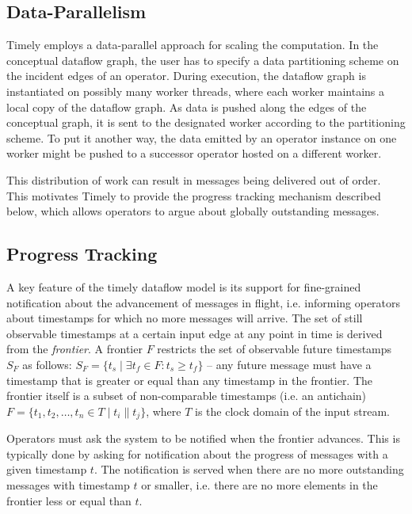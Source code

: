 \clearpage
\subsection{Data-Parallelism}

Timely employs a data-parallel approach for scaling the computation. In the
conceptual dataflow graph, the user has to specify a data partitioning scheme
on the incident edges of an operator. During execution, the dataflow graph
is instantiated on possibly many worker threads, where each worker maintains
a local copy of the dataflow graph. As data is pushed along the edges of the
conceptual graph, it is sent to the designated worker according to the
partitioning scheme. To put it another way, the data emitted by an operator
instance on one worker might be pushed to a successor operator
hosted on a different worker.

This distribution of work can result in messages being delivered out of
order. This motivates Timely to provide the progress tracking mechanism
described below, which allows operators to argue about globally
outstanding messages.

\subsection{Progress Tracking}

A key feature of the timely dataflow model is its support for fine-grained notification
about the advancement of messages in flight, i.e. informing operators about
timestamps for which no more messages will arrive. The set of still observable
timestamps at a certain input edge at any point in time is derived from the \emph{frontier}.
A frontier $F$ restricts the set of observable future timestamps $S_F$ as follows:
$S_F = \{ t_s \mid \exists t_f \in F: t_s \geq t_f \}$ -- any future message must
have a timestamp that is greater or equal than any timestamp in the frontier.
The frontier itself is a subset of non-comparable timestamps (i.e. an antichain)
$F = \{t_1, t_2, \dots, t_n \in T \mid  t_i \parallel t_j \}$, where
$T$ is the clock domain of the input stream.

Operators must ask the system to be notified when the frontier advances. This
is typically done by asking for notification about the progress of messages with
a given timestamp $t$. The
notification is served when there are no more outstanding messages with
timestamp $t$ or smaller, i.e. there are no more elements in the frontier less
or equal than $t$.

